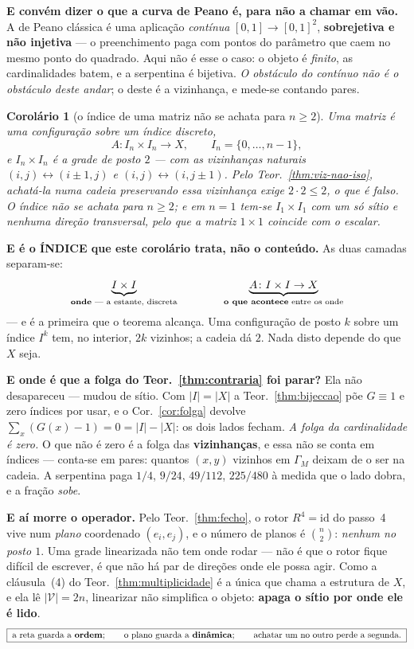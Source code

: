 \documentclass[11pt,a4paper]{article}
\newcommand{\abs}[1]{\lvert #1\rvert}
\newtheorem{corolario}[teorema]{Corolário}
\begin{document}
\medskip\noindent\textbf{E convém dizer o que a curva de Peano é, para não a chamar
em vão.} A de Peano clássica é uma aplicação \emph{contínua} $[0,1]\to[0,1]^2$,
\textbf{sobrejetiva e não injetiva} --- o preenchimento paga com pontos do parâmetro
que caem no mesmo ponto do quadrado. Aqui não é esse o caso: o objeto é
\emph{finito}, as cardinalidades batem, e a serpentina é bijetiva. \emph{O
obstáculo do contínuo não é o obstáculo deste andar}; o deste é a vizinhança, e
mede-se contando pares.

\begin{corolario}[o índice de uma matriz não se achata para $n\ge2$]\label{cor:matriz-nao-lin}
Uma matriz é uma configuração sobre um índice discreto,
\[
A\colon I_n\times I_n\longrightarrow X,\qquad I_n=\{0,\dots,n-1\},
\]
e $I_n\times I_n$ é a grade de posto $2$ --- com as vizinhanças naturais
$(i,j)\leftrightarrow(i\pm1,j)$ e $(i,j)\leftrightarrow(i,j\pm1)$. Pelo
Teor.~\ref{thm:viz-nao-iso}, achatá-la numa cadeia preservando essa vizinhança
exige $2\cdot2\le2$, o que é falso. \emph{O índice não se achata para $n\ge2$}; e
em $n=1$ tem-se $I_1\times I_1$ com um só sítio e nenhuma direção transversal, pelo
que a matriz $1\times1$ coincide com o escalar.
\end{corolario}

\medskip\noindent\textbf{E é o ÍNDICE que este corolário trata, não o conteúdo.}
As duas camadas separam-se:
\[
\underbrace{I\times I}_{\text{\textbf{onde} --- a estante, discreta}}
\qquad\qquad
\underbrace{A\colon I\times I\to X}_{\text{\textbf{o que acontece} entre os onde}}
\]
--- e é a primeira que o teorema alcança. Uma configuração de posto $k$ sobre um
índice $I^{k}$ tem, no interior, $2k$ vizinhos; a cadeia dá $2$. Nada disto depende
do que $X$ seja.

\medskip\noindent\textbf{E onde é que a folga do Teor.~\ref{thm:contraria} foi
parar?} Ela não desapareceu --- mudou de sítio. Com $\lvert I\rvert=\lvert X\rvert$
a Teor.~\ref{thm:bijeccao} põe $G\equiv1$ e zero índices por usar, e o
Cor.~\ref{cor:folga} devolve $\sum_x(G(x)-1)=0=\abs{I}-\abs{X}$: os dois lados
fecham. \emph{A folga da cardinalidade é zero.} O que não é zero é a folga das
\textbf{vizinhanças}, e essa não se conta em índices --- conta-se em pares: quantos
$(x,y)$ vizinhos em $\Gamma_M$ deixam de o ser na cadeia. A serpentina paga
$1/4$, $9/24$, $49/112$, $225/480$ à medida que o lado dobra, e a fração \emph{sobe}.

\medskip\noindent\textbf{E aí morre o operador.} Pelo Teor.~\ref{thm:fecho}, o
rotor $R^{4}=\mathrm{id}$ do passo~4 vive num \emph{plano} coordenado $(e_i,e_j)$, e
o número de planos é $\binom{n}{2}$: \emph{nenhum no posto $1$}. Uma grade
linearizada não tem onde rodar --- não é que o rotor fique difícil de escrever, é
que não há par de direções onde ele possa agir. Como a cláusula~(4) do
Teor.~\ref{thm:multiplicidade} é a única que chama a estrutura de $X$, e ela lê
$\lvert\mathcal{V}\rvert=2n$, linearizar não simplifica o objeto: \textbf{apaga o
sítio por onde ele é lido}.
\[
\boxed{\;\text{a reta guarda a \textbf{ordem}};\qquad
\text{o plano guarda a \textbf{dinâmica}};\qquad
\text{achatar um no outro perde a segunda.}\;}
\]
\end{document}

